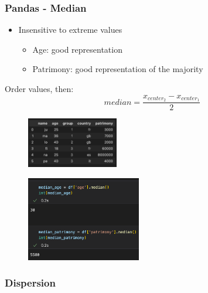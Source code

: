 \begin{frame}\frametitle{Pandas - Median}
   \begin{minipage}{0.58\linewidth}
      \begin{itemize}
         \item Insensitive to extreme values
         \begin{itemize}
            \item Age: good representation
            \item Patrimony: good representation of the majority
         \end{itemize}
      \end{itemize}
      \vspace{.5cm}
      Order values, then:
      $$median = \frac{x_{center_2} - x_{center_1}}{2}$$
      \begin{figure}[H]
         \includegraphics[width=4cm]{../images/illustrations/data_analysis_df_1.png}
      \end{figure}
   \end{minipage}
   \begin{minipage}{0.38\linewidth}
      \begin{figure}[H]
         \includegraphics[width=5cm]{../images/illustrations/median.png}
      \end{figure}
   \end{minipage}
\end{frame}



\subsubsection{Dispersion}


